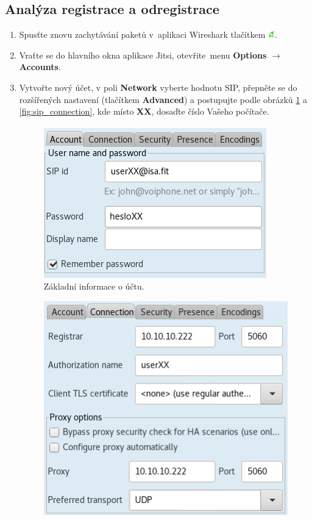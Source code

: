 \subsection{Analýza registrace a odregistrace}
\begin{enumerate}
    \item Spusťte znovu zachytávání paketů v aplikaci Wireshark tlačítkem \includegraphics[width=3mm]{img/ws_start.png}.
    \item Vraťte se do hlavního okna aplikace Jitsi, otevřite menu {\bf Options} $\rightarrow$ {\bf Accounts}.
    \item Vytvořte nový účet, v poli {\bf Network} vyberte hodnotu SIP, přepněte se do rozšířených nastavení (tlačítkem {\bf Advanced}) a postupujte podle obrázků \ref{fig:sip_account} a \ref{fig:sip_connection}, kde místo {\bf XX}, dosaďte číslo Vašeho počítače.\\
\begin{figure}[h!]
  \centering
  \includegraphics[scale=0.8]{img/sip_account.png}
  \caption{Základní informace o účtu.}
  \label{fig:sip_account}
\end{figure}
\begin{figure}[h!]
  \centering
  \includegraphics[scale=0.8]{img/sip_connection.png}

\end{figure}
\end{enumerate}

